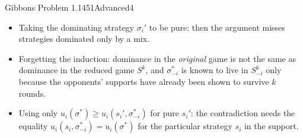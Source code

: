 \begin{exsol}{Gibbons Problem 1.14}{51}{Advanced}{4}
\mistakes
\begin{itemize}
  \item Taking the dominating strategy $\sigma_i'$ to be pure: then the argument misses strategies
  dominated only by a mix.
  \item Forgetting the induction: dominance in the \emph{original} game is not the same as dominance
  in the reduced game $S^k$, and $\sigma_{-i}^*$ is known to live in $S_{-i}^k$ only because the
  opponents' supports have already been shown to survive $k$ rounds.
  \item Using only $u_i(\sigma^*) \ge u_i(s_i', \sigma_{-i}^*)$ for pure $s_i'$: the contradiction needs
  the equality $u_i(s_i, \sigma_{-i}^*) = u_i(\sigma^*)$ for the particular strategy $s_i$ in the support.
\end{itemize}

\end{exsol}
